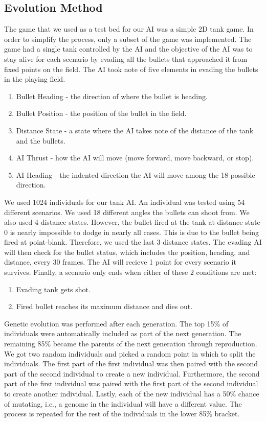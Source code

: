 \subsection{Evolution Method}
The game that we used as a test bed for our AI was a simple 2D tank game.
In order to simplify the process, only a subset of the game was implemented.
The game had a single tank controlled by the AI and the objective of the AI
was to stay alive for each scenario by evading all the bullets that approached
it from fixed points on the field. The AI took note of five elements in evading the
bullets in the playing field.

\begin{enumerate}
 \item Bullet Heading - the direction of where the bullet is heading.
 \item Bullet Position - the position of the bullet in the field.
 \item Distance State - a state where the AI takes note of the distance 
of the tank and the bullets.
 \item AI Thrust - how the AI will move (move forward, move backward, or stop).
 \item AI Heading - the indented direction the AI will move among the 18
possible direction.
\end{enumerate}

We used 1024 individuals for our tank AI. An individual was tested using 54 different
scenarios. We used 18 different angles the bullets can shoot from. We also used 4
distance states. However, the bullet fired at the tank at distance state 0 is nearly
impossible to dodge in nearly all cases. This is due to the bullet being fired at point-blank.
Therefore, we used the last 3 distance states. The evading AI will then check for the bullet
status, which includes the position, heading, and distance, every 30 frames. The AI will
recieve 1 point for every scenario it survives. Finally, a scenario only ends when either
of these 2 conditions are met:

\begin{enumerate}
 \item Evading tank gets shot.
 \item Fired bullet reaches its maximum distance and dies out.
\end{enumerate}

Genetic evolution was performed after each generation. The top 15\% of individuals
were automatically included as part of the next generation. The remaining 85\% became
the parents of the next generation through reproduction. We got two random individuals
and picked a random point in which to split the individuals. The first part of the 
first individual was then paired with the second part of the second individual to 
create a new individual. Furthermore, the second part of the first individual was
paired with the first part of the second individual to create another individual.
Lastly, each of the new individual has a 50\% chance of mutating, i.e., a genome
in the individual will have a different value. The process is repeated for the
rest of the individuals in the lower 85\% bracket.



